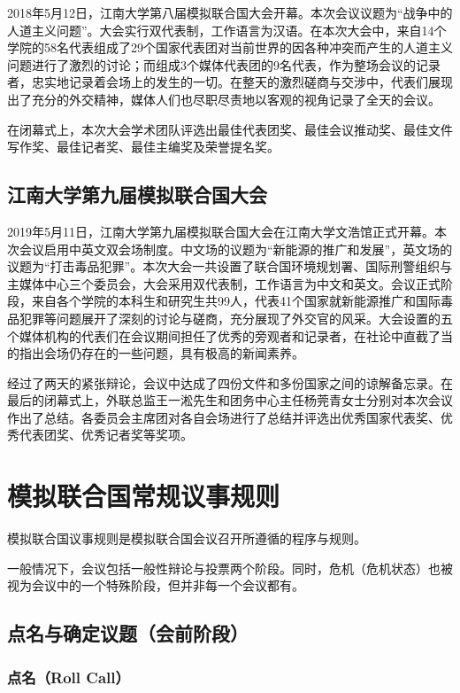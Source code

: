 \documentclass[a4paper,openany]{book}
\begin{document}
2018年5月12日，江南大学第八届模拟联合国大会开幕。本次会议议题为“战争中的人道主义问题”。大会实行双代表制，工作语言为汉语。在本次大会中，来自14个学院的58名代表组成了29个国家代表团对当前世界的因各种冲突而产生的人道主义问题进行了激烈的讨论；而组成3个媒体代表团的9名代表，作为整场会议的记录者，忠实地记录着会场上的发生的一切。在整天的激烈磋商与交涉中，代表们展现出了充分的外交精神，媒体人们也尽职尽责地以客观的视角记录了全天的会议。

在闭幕式上，本次大会学术团队评选出最佳代表团奖、最佳会议推动奖、最佳文件写作奖、最佳记者奖、最佳主编奖及荣誉提名奖。

\section{江南大学第九届模拟联合国大会}

2019年5月11日，江南大学第九届模拟联合国大会在江南大学文浩馆正式开幕。本次会议启用中英文双会场制度。中文场的议题为“新能源的推广和发展”，英文场的议题为“打击毒品犯罪”。本次大会一共设置了联合国环境规划署、国际刑警组织与主媒体中心三个委员会，大会采用双代表制，工作语言为中文和英文。会议正式阶段，来自各个学院的本科生和研究生共99人，代表41个国家就新能源推广和国际毒品犯罪等问题展开了深刻的讨论与磋商，充分展现了外交官的风采。大会设置的五个媒体机构的代表们在会议期间担任了优秀的旁观者和记录者，在社论中直截了当的指出会场仍存在的一些问题，具有极高的新闻素养。

经过了两天的紧张辩论，会议中达成了四份文件和多份国家之间的谅解备忘录。在最后的闭幕式上，外联总监王一淞先生和团务中心主任杨莞青女士分别对本次会议作出了总结。各委员会主席团对各自会场进行了总结并评选出优秀国家代表奖、优秀代表团奖、优秀记者奖等奖项。

\chapter{模拟联合国常规议事规则}

模拟联合国议事规则是模拟联合国会议召开所遵循的程序与规则。

一般情况下，会议包括一般性辩论与投票两个阶段。同时，危机（危机状态）也被视为会议中的一个特殊阶段，但并非每一个会议都有。

\section{点名与确定议题（会前阶段）}

\subsection{点名（Roll Call）}
\end{document}
